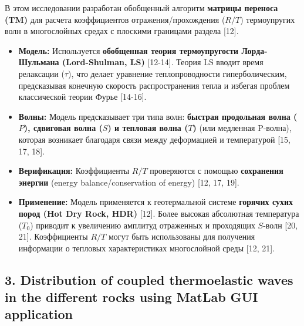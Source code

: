 \documentclass{article}
\begin{document}
В этом исследовании разработан обобщенный алгоритм \textbf{матрицы переноса (TM)} для расчета коэффициентов отражения/прохождения ($R/T$) термоупругих волн в многослойных средах с плоскими границами раздела [12].
\begin{itemize}
    \item \textbf{Модель:} Используется \textbf{обобщенная теория термоупругости Лорда-Шульмана (Lord-Shulman, LS)} [12-14]. Теория LS вводит время релаксации ($\tau$), что делает уравнение теплопроводности гиперболическим, предсказывая конечную скорость распространения тепла и избегая проблем классической теории Фурье [14-16].
    \item \textbf{Волны:} Модель предсказывает три типа волн: \textbf{быстрая продольная волна ($P$), сдвиговая волна ($S$) и тепловая волна ($T$)} (или медленная P-волна), которая возникает благодаря связи между деформацией и температурой [15, 17, 18].
    \item \textbf{Верификация:} Коэффициенты $R/T$ проверяются с помощью \textbf{сохранения энергии} (energy balance/conservation of energy) [12, 17, 19].
    \item \textbf{Применение:} Модель применяется к геотермальной системе \textbf{горячих сухих пород (Hot Dry Rock, HDR)} [12]. Более высокая абсолютная температура ($T_0$) приводит к увеличению амплитуд отраженных и проходящих $S$-волн [20, 21]. Коэффициенты $R/T$ могут быть использованы для получения информации о тепловых характеристиках многослойной среды [12, 21].
\end{itemize}

\subsection*{3. Distribution of coupled thermoelastic waves in the different rocks using MatLab GUI application}
\end{document}
